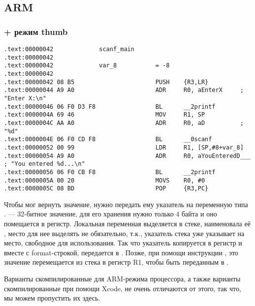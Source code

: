 ﻿%
\subsection{ARM}

\subsubsection{\OptimizingKeil + режим thumb}

\begin{lstlisting}
.text:00000042             scanf_main
.text:00000042
.text:00000042             var_8           = -8
.text:00000042
.text:00000042 08 B5                       PUSH    {R3,LR}
.text:00000044 A9 A0                       ADR     R0, aEnterX     ; "Enter X:\n"
.text:00000046 06 F0 D3 F8                 BL      __2printf
.text:0000004A 69 46                       MOV     R1, SP
.text:0000004C AA A0                       ADR     R0, aD          ; "%d"
.text:0000004E 06 F0 CD F8                 BL      __0scanf
.text:00000052 00 99                       LDR     R1, [SP,#8+var_8]
.text:00000054 A9 A0                       ADR     R0, aYouEnteredD___ ; "You entered %d...\n"
.text:00000056 06 F0 CB F8                 BL      __2printf
.text:0000005A 00 20                       MOVS    R0, #0
.text:0000005C 08 BD                       POP     {R3,PC}
\end{lstlisting}

Чтобы \scanf мог вернуть значение, нужно передать ему указатель на переменную типа \Tint. \Tint --- 32-битное 
значение, для его хранения нужно только 4 байта и оно помещается в регистр.
Локальная переменная  выделяется в стеке, \IDA наименовала её , место для нее выделять
не обязательно, т.к., указатель стека \SP уже указывает на место, свободное для использования.
Так что указатель \SP копируется в регистр  и вместе с format-строкой, передается в \scanf.
Позже, при помощи инструкции , это значение перемещается из стека в регистр R1, чтобы быть переданным
в \printf.

Варианты скомпилированные для ARM-режима процессора, а также варианты скомпилированные при помощи Xcode,
не очень отличаются от этого, так что, мы можем пропустить их здесь.

